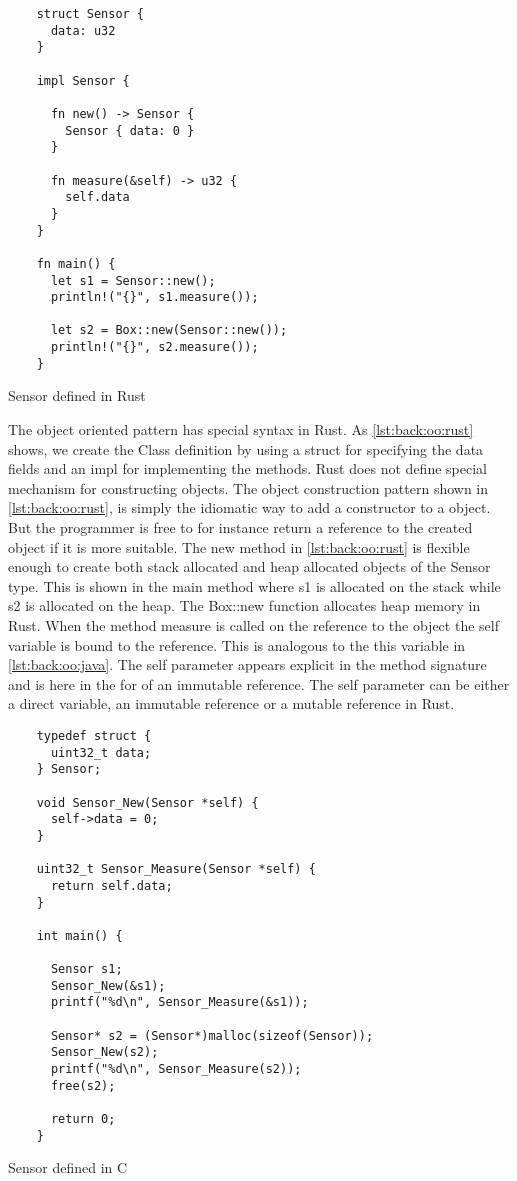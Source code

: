 \begin{listing}[H]
  \begin{verbatim}
    struct Sensor {
      data: u32
    }

    impl Sensor {

      fn new() -> Sensor {
        Sensor { data: 0 }
      }

      fn measure(&self) -> u32 {
        self.data
      }
    }

    fn main() {
      let s1 = Sensor::new();
      println!("{}", s1.measure());

      let s2 = Box::new(Sensor::new());
      println!("{}", s2.measure());
    }
  \end{verbatim}
  \caption{Sensor defined in Rust}
  \label{lst:back:oo:rust}
\end{listing}

The object oriented pattern has special syntax in Rust.
As \autoref{lst:back:oo:rust} shows, we create the Class definition by using a struct for specifying the data fields and an impl for implementing the methods.
Rust does not define special mechanism for constructing objects.
The object construction pattern shown in \autoref{lst:back:oo:rust}, is simply the idiomatic way to add a constructor to a object.
But the programmer is free to for instance return a reference to the created object if it is more suitable.
The new method in \autoref{lst:back:oo:rust} is flexible enough to create both stack allocated and heap allocated objects of the Sensor type.
This is shown in the main method where s1 is allocated on the stack while s2 is allocated on the heap.
The Box::new function allocates heap memory in Rust.
When the method measure is called on the reference to the object the self variable is bound to the reference.
This is analogous to the this variable in \autoref{lst:back:oo:java}.
The self parameter appears explicit in the method signature and is here in the for of an immutable reference.
The self parameter can be either a direct variable, an immutable reference or a mutable reference in Rust.

\begin{listing}[H]
  \begin{verbatim}
    typedef struct {
      uint32_t data;
    } Sensor;

    void Sensor_New(Sensor *self) {
      self->data = 0;
    }

    uint32_t Sensor_Measure(Sensor *self) {
      return self.data;
    }

    int main() {

      Sensor s1;
      Sensor_New(&s1);
      printf("%d\n", Sensor_Measure(&s1));

      Sensor* s2 = (Sensor*)malloc(sizeof(Sensor));
      Sensor_New(s2);
      printf("%d\n", Sensor_Measure(s2));
      free(s2);

      return 0;
    }
  \end{verbatim}
  \caption{Sensor defined in C}
  \label{lst:back:oo:c}
\end{listing}

